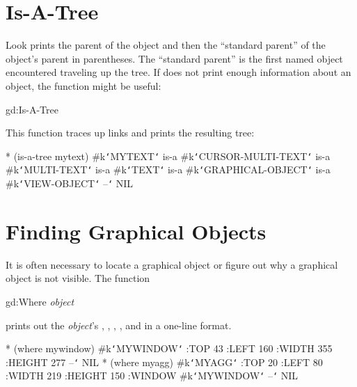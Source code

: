 \section{Is-A-Tree}
Look prints the parent of the object and then the ``standard
parent''  of the object's parent in parentheses.
The ``standard parent'' is
the first named object encountered traveling up the 
tree.  If  does not print enough information about an object,
the  function might be useful:
\begin{programexample}
gd:Is-A-Tree\value{function}
\end{programexample}
This function traces up  links and prints the resulting
tree:
\begin{programexample}
* (is-a-tree mytext)
\#k{\tt\char`\<}MYTEXT{\tt\char`\>} is-a
   \#k{\tt\char`\<}CURSOR-MULTI-TEXT{\tt\char`\>} is-a
      \#k{\tt\char`\<}MULTI-TEXT{\tt\char`\>} is-a
         \#k{\tt\char`\<}TEXT{\tt\char`\>} is-a
            \#k{\tt\char`\<}GRAPHICAL-OBJECT{\tt\char`\>} is-a
               \#k{\tt\char`\<}VIEW-OBJECT{\tt\char`\>}
--{\tt\char`\>} NIL
\end{programexample}

\section{Finding Graphical Objects}
It is often necessary to locate 
a graphical object or figure out
why a graphical object is not visible.   The function
\begin{programexample}
gd:Where {\it object}\value{function}
\end{programexample}
prints out the {\it object}'s , , ,
, and  in a one-line format.

\begin{programexample}
* (where mywindow)
\#k{\tt\char`\<}MYWINDOW{\tt\char`\>} :TOP 43 :LEFT 160 :WIDTH 355 :HEIGHT 277
--{\tt\char`\>} NIL
* (where myagg)
\#k{\tt\char`\<}MYAGG{\tt\char`\>} :TOP 20 :LEFT 80 :WIDTH 219 :HEIGHT 150 :WINDOW \#k{\tt\char`\<}MYWINDOW{\tt\char`\>}
--{\tt\char`\>} NIL
\end{programexample}


